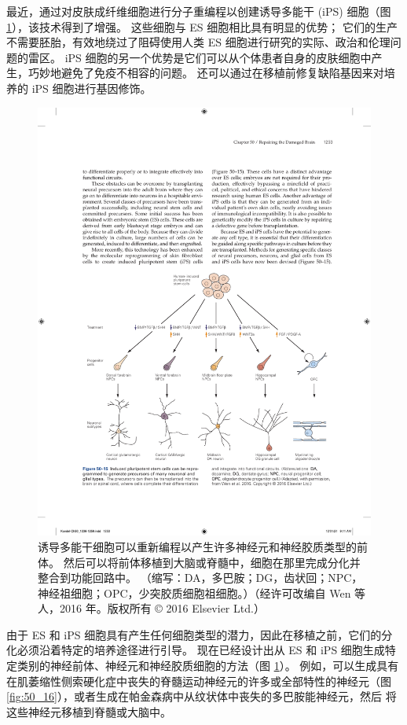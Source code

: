 最近，通过对皮肤成纤维细胞进行分子重编程以创建诱导多能干 (iPS) 细胞（图 \ref{fig:50_15}），该技术得到了增强。 
这些细胞与 ES 细胞相比具有明显的优势； 它们的生产不需要胚胎，有效地绕过了阻碍使用人类 ES 细胞进行研究的实际、政治和伦理问题的雷区。 iPS 细胞的另一个优势是它们可以从个体患者自身的皮肤细胞中产生，巧妙地避免了免疫不相容的问题。 还可以通过在移植前修复缺陷基因来对培养的 iPS 细胞进行基因修饰。

\begin{figure}[htbp]
	\centering
	\includegraphics[width=0.9\linewidth]{chap50/fig_50_15}
	\caption{诱导多能干细胞可以重新编程以产生许多神经元和神经胶质类型的前体。 然后可以将前体移植到大脑或脊髓中，细胞在那里完成分化并整合到功能回路中。 （缩写：DA，多巴胺；DG，齿状回；NPC，神经祖细胞；OPC，少突胶质细胞祖细胞。）（经许可改编自 Wen 等人，2016 年。版权所有 © 2016 Elsevier Ltd.）}
	\label{fig:50_15}
\end{figure}

由于 ES 和 iPS 细胞具有产生任何细胞类型的潜力，因此在移植之前，它们的分化必须沿着特定的培养途径进行引导。 现在已经设计出从 ES 和 iPS 细胞生成特定类别的神经前体、神经元和神经胶质细胞的方法（图 \ref{fig:50_15}）。 
例如，可以生成具有在肌萎缩性侧索硬化症中丧失的脊髓运动神经元的许多或全部特性的神经元（图 \ref{fig:50_16}），或者生成在帕金森病中从纹状体中丧失的多巴胺能神经元，然后 将这些神经元移植到脊髓或大脑中。


